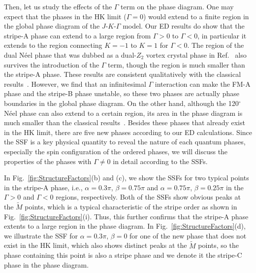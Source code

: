 \documentclass[aps,prb,reprint,amsfonts,amsmath,amssymb,showpacs,groupedaddress,superscriptaddress]{revtex4-1}
\begin{document}
Then, let us study the effects of the $\Gamma$ term on the phase diagram. One may expect that the phases in the HK limit ($\Gamma=0$) would extend to a finite region in the global phase diagram of the $J$-$K$-$\Gamma$ model. Our ED results do show that the stripe-A phase can extend to a large region from $\Gamma>0$ to $\Gamma<0$, in particular it extends to the region connecting $K=-1$ to $K=1$ for $\Gamma<0$. The region of the dual N\'{e}el phase that was dubbed as a dual-$Z_{2}$ vortex crystal phase in Ref.~ also survives
the introduction of the $\Gamma$ term, though the region is much smaller than the stripe-A phase. These results
are consistent qualitatively with the classical results~\cite{PhysRevB.92.165108}. However, we find that an infinitesimal $\Gamma$ interaction can make the FM-A phase and the stripe-B phase unstable, so these two phases are actually phase boundaries in the global phase diagram. On the other hand, although the 120$^\circ$ N\'{e}el phase can also extend to a certain region, its area in the phase diagram is much smaller than the classical results~\cite{PhysRevB.92.165108}. Besides these phases that already exist in the HK limit, there are five new phases according to our ED calculations. Since the SSF is a key physical quantity to reveal the nature of each quantum phases, especially the spin configuration of the ordered phases, we will discuss the properties of the phases with $\Gamma\neq0$ in detail according to the SSFs.

In Fig.~\ref{fig:StructureFactors}(b) and (c), we show the SSFs for two typical points in the stripe-A phase, i.e., $\alpha=0.3\pi$, $\beta=0.75\pi$ and $\alpha=0.75\pi$, $\beta=0.25\pi$ in the $\Gamma>0$ and $\Gamma<0$ regions, respectively. Both of the SSFs show obvious peaks at the $\tilde{M}$ points, which is a typical characteristic of the stripe order as shown in Fig.~\ref{fig:StructureFactors}(i). Thus, this further confirms that the stripe-A phase extents to a large region in the phase diagram. In Fig.~\ref{fig:StructureFactors}(d), we illustrate the SSF for $\alpha=0.3\pi$, $\beta=0$ for one of the new phase that does not exist in the HK limit, which also shows distinct peaks at the $\tilde{M}$ points, so the phase containing this point is also a stripe phase and we denote it the stripe-C phase in the phase diagram.
\end{document}
